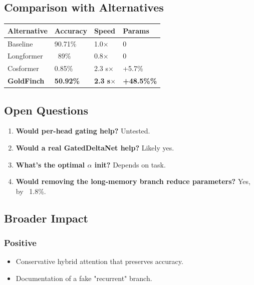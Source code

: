 \subsection{Comparison with Alternatives}

\begin{table}[H]
\centering
\small
\begin{tabular}{llll}
\toprule
\textbf{Alternative} & \textbf{Accuracy} & \textbf{Speed} & \textbf{Params} \\
\midrule
Baseline & 90.71\% & 1.0$\times$ & 0 \\
Longformer & ~89\% & 0.8$\times$ & 0 \\
Cosformer & 0.85\% & 2.3 s$\times$ & +5.7\% \\
\textbf{GoldFinch} & \textbf{50.92\%} & \textbf{2.3 s$\times$} & \textbf{+48.5\%\%} \\
\bottomrule
\end{tabular}
\end{table}

\subsection{Open Questions}

\begin{enumerate}
\item \textbf{Would per-head gating help?} Untested.
\item \textbf{Would a real GatedDeltaNet help?} Likely yes.
\item \textbf{What's the optimal $\alpha$ init?} Depends on task.
\item \textbf{Would removing the long-memory branch reduce parameters?} Yes, by ~1.8\%.

\end{enumerate}
\subsection{Broader Impact}

\subsubsection{Positive}

\begin{itemize}
\item Conservative hybrid attention that preserves accuracy.
\item Documentation of a fake "recurrent" branch.

\end{itemize}
